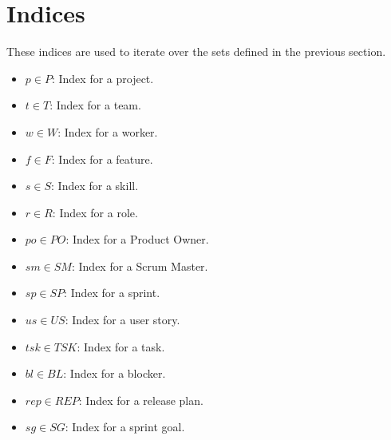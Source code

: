 \documentclass[11pt]{article}
\begin{document}
\section{Indices}
These indices are used to iterate over the sets defined in the previous section.
\begin{itemize}
    \item $p \in P$: Index for a project.
    \item $t \in T$: Index for a team.
    \item $w \in W$: Index for a worker.
    \item $f \in F$: Index for a feature.
    \item $s \in S$: Index for a skill.
    \item $r \in R$: Index for a role.
    \item $po \in PO$: Index for a Product Owner.
    \item $sm \in SM$: Index for a Scrum Master.
    \item $sp \in SP$: Index for a sprint.
    \item $us \in US$: Index for a user story.
    \item $tsk \in TSK$: Index for a task.
    \item $bl \in BL$: Index for a blocker.
    \item $rep \in REP$: Index for a release plan.
    \item $sg \in SG$: Index for a sprint goal.
\end{itemize}
\newpage
\end{document}
